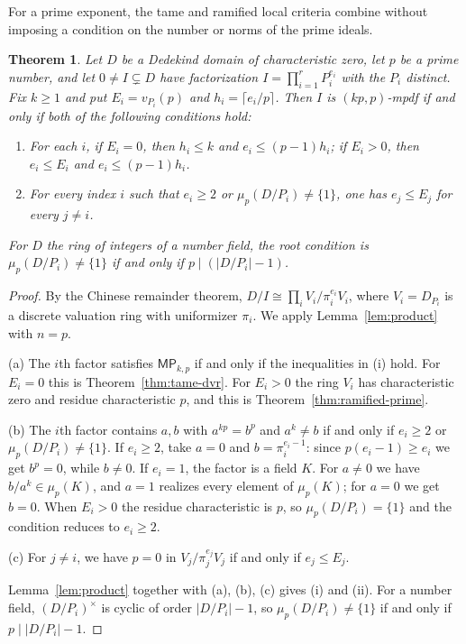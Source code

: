 \documentclass[11pt,a4paper]{amsart}
\newtheorem{theorem}{Theorem}[section]
\theoremstyle{definition}
\theoremstyle{remark}
\newcommand{\MP}[2]{\mathsf{MP}_{#1,#2}}
\numberwithin{equation}{section}
\begin{document}
For a prime exponent, the tame and ramified local criteria combine
without imposing a condition on the number or norms of the prime ideals.



\begin{theorem}
\label{thm:dedekind-prime}
Let $D$ be a Dedekind domain of characteristic zero, let $p$ be a prime
number, and let $0\ne I\subsetneq D$ have factorization
$I=\prod_{i=1}^rP_i^{e_i}$ with the $P_i$ distinct. Fix $k\ge1$ and put
$E_i=v_{P_i}(p)$ and $h_i=\lceil e_i/p\rceil$.
Then $I$ is $(kp,p)$-mpdf if and only if both of the following conditions
hold:
\begin{enumerate}
\item For each $i$, if $E_i=0$, then $h_i\le k$ and
      $e_i\le(p-1)h_i$; if $E_i>0$, then $e_i\le E_i$ and
      $e_i\le(p-1)h_i$.
\item For every index $i$ such that $e_i\ge2$ or
      $\mu_p(D/P_i)\ne\{1\}$, one has $e_j\le E_j$ for every $j\ne i$.
\end{enumerate}
For $D$ the ring of integers of a number field, the root condition is
$\mu_p(D/P_i)\ne\{1\}$ if and only if $p\mid(|D/P_i|-1)$.
\end{theorem}
\begin{proof}
By the Chinese remainder theorem, $D/I\cong\prod_iV_i/\pi_i^{e_i}V_i$, where
$V_i=D_{P_i}$ is a discrete valuation ring with uniformizer $\pi_i$.
We apply Lemma~\ref{lem:product} with $n=p$.

(a) The $i$th factor satisfies $\MP{k}{p}$ if and only if the inequalities in (i) hold.
For $E_i=0$ this is Theorem~\ref{thm:tame-dvr}. For $E_i>0$ the ring $V_i$ has
characteristic zero and residue characteristic $p$, and this is
Theorem~\ref{thm:ramified-prime}.

(b) The $i$th factor contains $a,b$ with $a^{kp}=b^p$ and $a^k\ne b$ if and only if
$e_i\ge2$ or $\mu_p(D/P_i)\ne\{1\}$.
If $e_i\ge2$, take $a=0$ and $b=\pi_i^{e_i-1}$: since $p(e_i-1)\ge e_i$ we get
$b^p=0$, while $b\ne0$.
If $e_i=1$, the factor is a field $K$. For $a\ne0$ we have $b/a^k\in\mu_p(K)$, and
$a=1$ realizes every element of $\mu_p(K)$; for $a=0$ we get $b=0$.
When $E_i>0$ the residue characteristic is $p$, so $\mu_p(D/P_i)=\{1\}$ and
the condition reduces to $e_i\ge2$.

(c) For $j\ne i$, we have $p=0$ in $V_j/\pi_j^{e_j}V_j$ if and only if $e_j\le E_j$.

Lemma~\ref{lem:product} together with (a), (b), (c) gives (i) and (ii).
For a number field, $(D/P_i)^\times$ is cyclic of order $|D/P_i|-1$, so
$\mu_p(D/P_i)\ne\{1\}$ if and only if $p\mid|D/P_i|-1$.
\end{proof}
\end{document}
